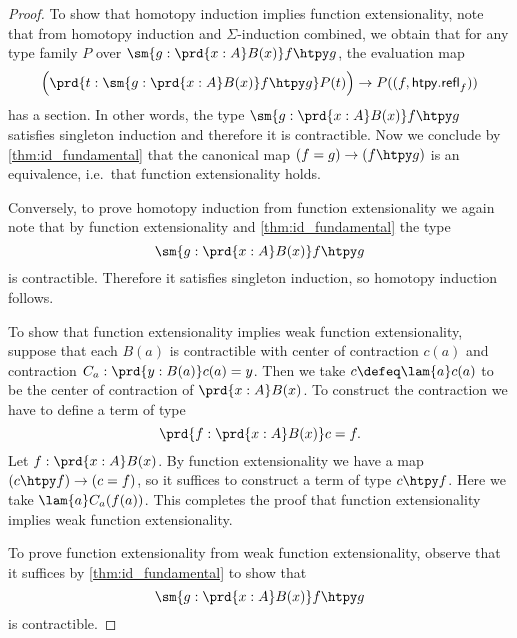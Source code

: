 \begin{proof}
To show that homotopy induction implies function extensionality, note that from homotopy induction and $\Sigma$-induction combined, we obtain that for any type family $P$ over $\sm{g:\prd{x:A}B(x)}f\htpy g$, the evaluation map
\begin{equation*}
\Big(\prd{t:\sm{g:\prd{x:A}B(x)}f\htpy g} P(t)\Big)\to P((f,\mathsf{htpy.refl}_f))
\end{equation*}
has a section. In other words, the type $\sm{g:\prd{x:A}B(x)}f\htpy g$ satisfies singleton induction and therefore it is contractible. Now we conclude by \cref{thm:id_fundamental} that the canonical map $(f=g)\to (f\htpy g)$ is an equivalence, i.e.~that function extensionality holds.

Conversely, to prove homotopy induction from function extensionality we again note that by function extensionality and \cref{thm:id_fundamental} the type 
\begin{equation*}
\sm{g:\prd{x:A}B(x)}f\htpy g
\end{equation*}
is contractible. Therefore it satisfies singleton induction, so homotopy induction follows.

To show that function extensionality implies weak function extensionality, suppose that each $B(a)$ is contractible with center of contraction $c(a)$ and contraction $C_a:\prd{y:B(a)}c(a)=y$. Then we take $c\defeq \lam{a}c(a)$ to be the center of contraction of $\prd{x:A}B(x)$. To construct the contraction we have to define a term of type
\begin{equation*}
\prd{f:\prd{x:A}B(x)}c=f.
\end{equation*}
Let $f:\prd{x:A}B(x)$. By function extensionality we have a map $(c\htpy f)\to (c=f)$, so it suffices to construct a term of type $c\htpy f$. Here we take $\lam{a}C_a(f(a))$. This completes the proof that function extensionality implies weak function extensionality.

To prove function extensionality from weak function extensionality, observe that it suffices by \autoref{thm:id_fundamental} to show that
\begin{equation*}
\sm{g:\prd{x:A}B(x)}f\htpy g
\end{equation*}
is contractible.


\end{proof}
